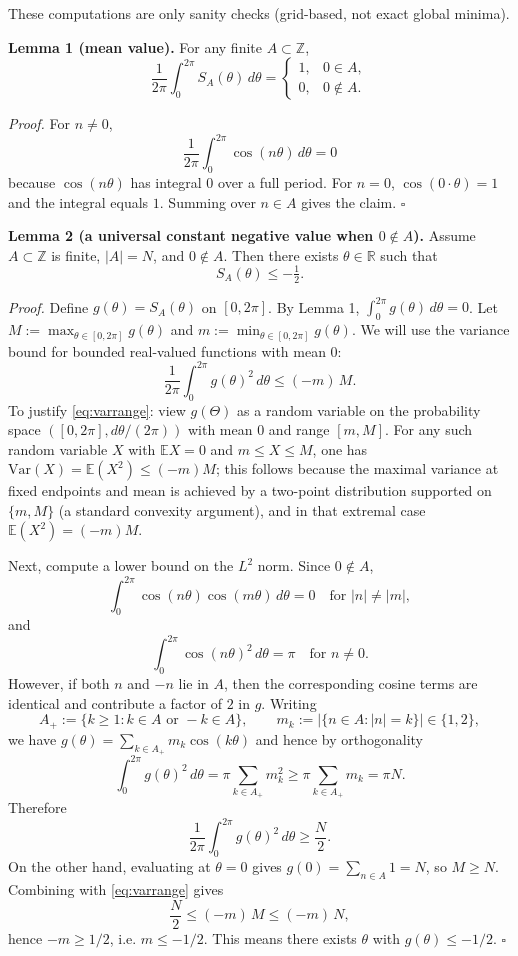 These computations are only sanity checks (grid-based, not exact global minima).

\medskip
\noindent\textbf{Lemma 1 (mean value).}
For any finite $A\subset\mathbb{Z}$,
\[
\frac{1}{2\pi}\int_0^{2\pi} S_A(\theta)\,d\theta = \begin{cases}
1,& 0\in A,\\
0,& 0\notin A.
\end{cases}
\]

\textit{Proof.}
For $n\neq 0$,
\[
\frac{1}{2\pi}\int_0^{2\pi} \cos(n\theta)\,d\theta = 0
\]
because $\cos(n\theta)$ has integral $0$ over a full period. For $n=0$, $\cos(0\cdot\theta)=1$ and the integral equals $1$. Summing over $n\in A$ gives the claim.
\hfill$\square$

\medskip
\noindent\textbf{Lemma 2 (a universal constant negative value when $0\notin A$).}
Assume $A\subset\mathbb{Z}$ is finite, $|A|=N$, and $0\notin A$. Then there exists $\theta\in\mathbb{R}$ such that
\[
S_A(\theta)\le -\tfrac12.
\]

\textit{Proof.}
Define $g(\theta)=S_A(\theta)$ on $[0,2\pi]$. By Lemma 1, $\int_0^{2\pi} g(\theta)\,d\theta=0$.
Let $M:=\max_{\theta\in[0,2\pi]} g(\theta)$ and $m:=\min_{\theta\in[0,2\pi]} g(\theta)$.
We will use the variance bound for bounded real-valued functions with mean $0$:
\begin{equation}\label{eq:varrange}
\frac{1}{2\pi}\int_0^{2\pi} g(\theta)^2\,d\theta \le (-m)\,M.
\end{equation}
To justify \eqref{eq:varrange}: view $g(\Theta)$ as a random variable on the probability space $([0,2\pi], d\theta/(2\pi))$ with mean $0$ and range $[m,M]$. For any such random variable $X$ with $\mathbb{E}X=0$ and $m\le X\le M$, one has $\mathrm{Var}(X)=\mathbb{E}(X^2)\le (-m)M$; this follows because the maximal variance at fixed endpoints and mean is achieved by a two-point distribution supported on $\{m,M\}$ (a standard convexity argument), and in that extremal case $\mathbb{E}(X^2)=(-m)M$.

Next, compute a lower bound on the $L^2$ norm. Since $0\notin A$,
\[
\int_0^{2\pi} \cos(n\theta)\cos(m\theta)\,d\theta = 0\quad\text{for } |n|\neq |m|,
\]
and
\[
\int_0^{2\pi} \cos(n\theta)^2\,d\theta = \pi\quad\text{for }n\neq 0.
\]
However, if both $n$ and $-n$ lie in $A$, then the corresponding cosine terms are identical and contribute a factor of $2$ in $g$. Writing
\[
A_+:=\{k\ge 1: k\in A\text{ or }-k\in A\},\qquad m_k:=|\{n\in A: |n|=k\}|\in\{1,2\},
\]
we have $g(\theta)=\sum_{k\in A_+} m_k \cos(k\theta)$ and hence by orthogonality
\[
\int_0^{2\pi} g(\theta)^2\,d\theta = \pi\sum_{k\in A_+} m_k^2 \ge \pi\sum_{k\in A_+} m_k = \pi N.
\]
Therefore
\[
\frac{1}{2\pi}\int_0^{2\pi} g(\theta)^2\,d\theta \ge \frac{N}{2}.
\]
On the other hand, evaluating at $\theta=0$ gives $g(0)=\sum_{n\in A}1=N$, so $M\ge N$.
Combining with \eqref{eq:varrange} gives
\[
\frac{N}{2}\le (-m)\,M \le (-m)\,N,
\]
hence $-m\ge 1/2$, i.e. $m\le -1/2$. This means there exists $\theta$ with $g(\theta)\le -1/2$.
\hfill$\square$

